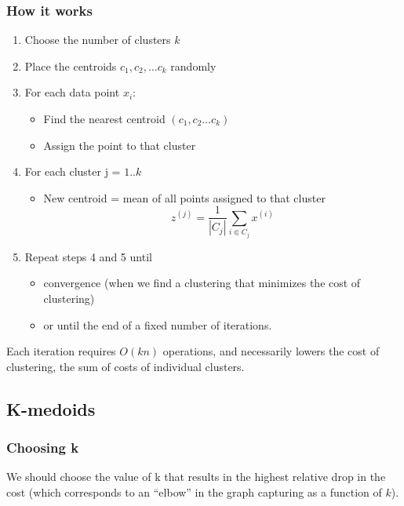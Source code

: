 \documentclass[a4paper]{article}
\begin{document}
\subsubsection{How it works}
\begin{enumerate}
	\item Choose the number of clusters $k$
	\item Place the centroids $c_1, c_2, \ldots c_k$ randomly
	\item For each data point $x_i$:
	\begin{itemize}[label=$\circ$]
		\item Find the nearest centroid $(c_1, c_2 \ldots c_k)$
		\item Assign the point to that cluster
	\end{itemize}
	\item For each cluster j = $1..k$
	\begin{itemize}[label=$\circ$]
		\item New centroid = mean of all points assigned to that cluster $$z^{(j)} = \frac{1}{|C_j|} \sum_{i \Subset C_j} x^{(i)}$$
	\end{itemize}
	\item Repeat steps 4 and 5 until
	\begin{itemize}[label=$\circ$]
		\item convergence (when we find a clustering that minimizes the cost of clustering)
		\item or until the end of a fixed number of iterations.
	\end{itemize}
\end{enumerate}
Each iteration requires $O(kn)$ operations, and necessarily lowers the cost of clustering, the sum of costs of individual clusters.
\subsection{K-medoids}
\subsubsection{Choosing k}
We should choose the value of k that results in the highest relative drop in the cost (which corresponds to an “elbow” in the graph capturing as a function of $k$).
\end{document}
